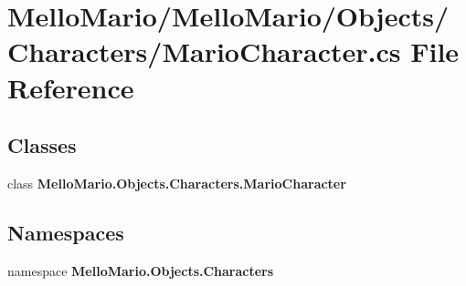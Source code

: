 \section{Mello\+Mario/\+Mello\+Mario/\+Objects/\+Characters/\+Mario\+Character.cs File Reference}
\label{MarioCharacter_8cs}
\subsection*{Classes}
\begin{DoxyCompactItemize}
\item 
class \textbf{ Mello\+Mario.\+Objects.\+Characters.\+Mario\+Character}
\end{DoxyCompactItemize}
\subsection*{Namespaces}
\begin{DoxyCompactItemize}
\item 
namespace \textbf{ Mello\+Mario.\+Objects.\+Characters}
\end{DoxyCompactItemize}
